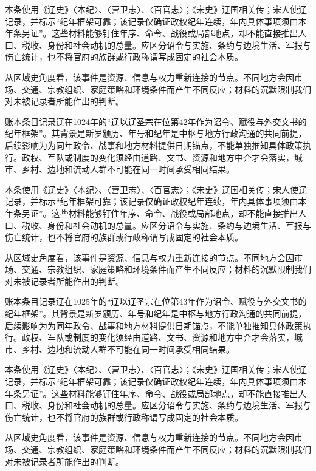 本条使用《辽史》〈本纪〉、〈营卫志〉、〈百官志〉；《宋史》辽国相关传；宋人使辽记录，并标示“纪年框架可靠；该记录仅确证政权纪年连续，年内具体事项须由本年条另证”。这些材料能够钉住年序、命令、战役或局部地点，却不能直接推出人口、税收、身份和社会动机的总量。应区分诏令与实施、条约与边境生活、军报与伤亡统计，也不将官府的族群或行政称谓写成固定的社会本质。

从区域史角度看，该事件是资源、信息与权力重新连接的节点。不同地方会因市场、交通、宗教组织、家庭策略和环境条件而产生不同反应；材料的沉默限制我们对未被记录者所能作出的判断。

账本条目记录辽在1024年的“辽以辽圣宗在位第42年作为诏令、赋役与外交文书的纪年框架”。其背景是新岁颁历、年号和纪年是中枢与地方行政沟通的共同前提，后续影响为为同年政令、战事和地方材料提供日期锚点，不能单独推知具体政策执行。政权、军队或制度的变化须经由道路、文书、资源和地方中介才会落实，城市、乡村、边地和流动人群不可能在同一时间承受相同结果。

本条使用《辽史》〈本纪〉、〈营卫志〉、〈百官志〉；《宋史》辽国相关传；宋人使辽记录，并标示“纪年框架可靠；该记录仅确证政权纪年连续，年内具体事项须由本年条另证”。这些材料能够钉住年序、命令、战役或局部地点，却不能直接推出人口、税收、身份和社会动机的总量。应区分诏令与实施、条约与边境生活、军报与伤亡统计，也不将官府的族群或行政称谓写成固定的社会本质。

从区域史角度看，该事件是资源、信息与权力重新连接的节点。不同地方会因市场、交通、宗教组织、家庭策略和环境条件而产生不同反应；材料的沉默限制我们对未被记录者所能作出的判断。

账本条目记录辽在1025年的“辽以辽圣宗在位第43年作为诏令、赋役与外交文书的纪年框架”。其背景是新岁颁历、年号和纪年是中枢与地方行政沟通的共同前提，后续影响为为同年政令、战事和地方材料提供日期锚点，不能单独推知具体政策执行。政权、军队或制度的变化须经由道路、文书、资源和地方中介才会落实，城市、乡村、边地和流动人群不可能在同一时间承受相同结果。

本条使用《辽史》〈本纪〉、〈营卫志〉、〈百官志〉；《宋史》辽国相关传；宋人使辽记录，并标示“纪年框架可靠；该记录仅确证政权纪年连续，年内具体事项须由本年条另证”。这些材料能够钉住年序、命令、战役或局部地点，却不能直接推出人口、税收、身份和社会动机的总量。应区分诏令与实施、条约与边境生活、军报与伤亡统计，也不将官府的族群或行政称谓写成固定的社会本质。

从区域史角度看，该事件是资源、信息与权力重新连接的节点。不同地方会因市场、交通、宗教组织、家庭策略和环境条件而产生不同反应；材料的沉默限制我们对未被记录者所能作出的判断。

